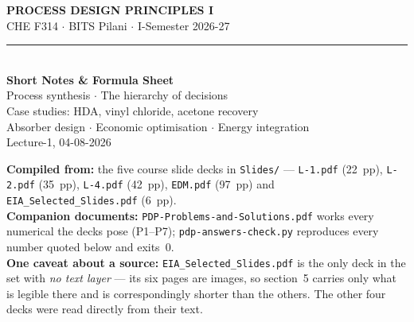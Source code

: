 \documentclass[10pt,a4paper]{article}
\newenvironment{daybox}{%
  \par\addvspace{4pt}\noindent\begin{lrbox}{\spboxa}%
  \begin{minipage}{\dimexpr\linewidth-12pt\relax}\small\color{notecol}%
}{\end{minipage}\end{lrbox}%
  \fcolorbox{boxframe}{white}{\usebox{\spboxa}}\par\addvspace{6pt}}
\providecommand{\textperiodcentered}{\ensuremath{\cdot}}
\begin{document}

\begin{center}
{\LARGE\bfseries\color{accent} PROCESS DESIGN PRINCIPLES I}\\[2pt]
{\color{accent2} CHE F314 \textperiodcentered{} BITS Pilani \textperiodcentered{} I-Semester 2026-27}\\[4pt]
{\color{rule}\rule{0.6\linewidth}{0.8pt}}\\[6pt]
{\Large\bfseries\color{accent} Short Notes \& Formula Sheet}\\[4pt]
{\color{accent2} Process synthesis \textperiodcentered{} The hierarchy of decisions\\
 Case studies: HDA, vinyl chloride, acetone recovery\\
 Absorber design \textperiodcentered{} Economic optimisation \textperiodcentered{} Energy integration}\\[3pt]
{\footnotesize\color{notecol} Lecture-1, 04-08-2026}
\end{center}

\vspace{2mm}
\begin{daybox}
\textbf{Compiled from:} the five course slide decks in \texttt{Slides/} --- \texttt{L-1.pdf} (22~pp), \texttt{L-2.pdf} (35~pp), \texttt{L-4.pdf} (42~pp), \texttt{EDM.pdf} (97~pp) and \texttt{EIA\_Selected\_Slides.pdf} (6~pp).\\[2pt]
\textbf{Companion documents:} \texttt{PDP-Problems-and-Solutions.pdf} works every numerical the decks pose (P1--P7); \texttt{pdp-answers-check.py} reproduces every number quoted below and exits~0.\\[2pt]
\textbf{One caveat about a source:} \texttt{EIA\_Selected\_Slides.pdf} is the only deck in the set with \emph{no text layer} --- its six pages are images, so section~5 carries only what is legible there and is correspondingly shorter than the others. The other four decks were read directly from their text.
\end{daybox}
\end{document}
